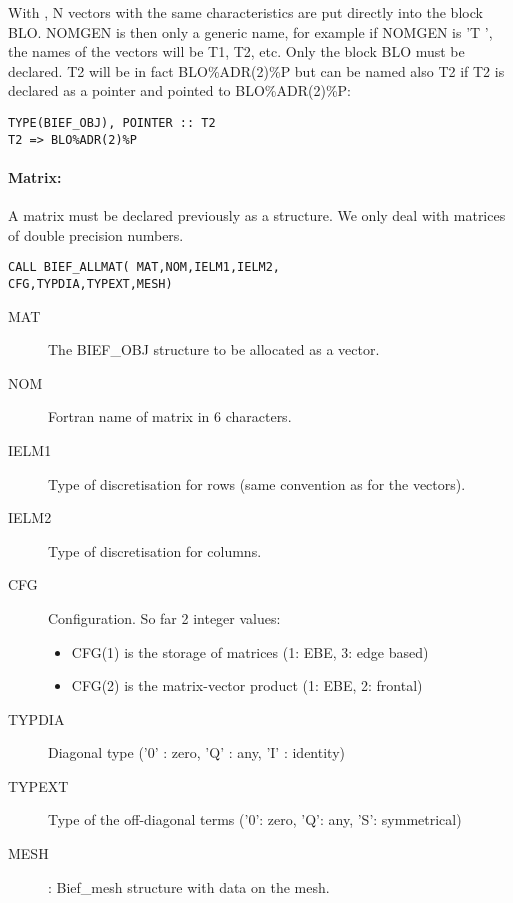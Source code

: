 With , N vectors with the same characteristics
are put directly into the block BLO. NOMGEN is then only a generic name, for
example if NOMGEN is 'T     ', the names of the vectors will be T1, T2, etc. Only
the block BLO must be declared. T2 will be in fact BLO\%ADR(2)\%P but can be
named also T2 if T2 is declared as a  pointer and pointed to
BLO\%ADR(2)\%P:

\begin{lstlisting}[language=TelFortran]
TYPE(BIEF_OBJ), POINTER :: T2
T2 => BLO%ADR(2)%P
\end{lstlisting}

\paragraph{Matrix: }

A matrix must be declared previously as a  structure. We only
deal with matrices of double precision numbers.

\begin{lstlisting}[language=TelFortran]
CALL BIEF_ALLMAT( MAT,NOM,IELM1,IELM2,
CFG,TYPDIA,TYPEXT,MESH)
\end{lstlisting}

\begin{description}
\item [MAT] The BIEF\_OBJ structure to be allocated as a vector.
\item [NOM] Fortran name of matrix in 6 characters.
\item [IELM1] Type of discretisation for rows (same convention as for the
  vectors).
\item [IELM2] Type of discretisation for columns.
\item [CFG] Configuration. So far 2 integer values:
\begin{itemize}
  \item CFG(1) is the storage of matrices (1: EBE, 3: edge based)
  \item CFG(2) is the matrix-vector product (1: EBE, 2: frontal)
\end{itemize}
\item [TYPDIA] Diagonal type ('0' : zero, 'Q' : any, 'I' : identity)
\item [TYPEXT] Type of the off-diagonal terms ('0': zero, 'Q': any, 'S':
  symmetrical)
\item [MESH]  : Bief\_mesh structure with data on the mesh.
\end{description}

